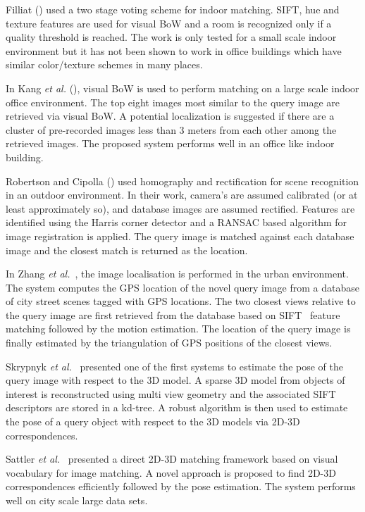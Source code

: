 Filliat (\cite{davidf07}) used a two stage voting
scheme for indoor matching. 
SIFT, hue and texture features are used for visual
BoW and a room is recognized only
if a quality threshold is reached. 
The work is only tested for a small scale indoor 
environment but it has not been shown to work 
in office buildings which have similar 
color/texture schemes in many places.


In Kang \emph{et al.} (\cite{kang09}), visual BoW is used to perform matching
on a large scale indoor office environment. 
The top eight images most similar to the query image are 
retrieved via visual BoW. A potential localization
is suggested if there are a cluster of pre-recorded images less than 3 meters from each
other among the retrieved images. The proposed system
performs well in an office like indoor building.


Robertson and Cipolla (\cite{duncan04}) used homography and rectification 
for scene recognition in an outdoor environment.
In their work, camera's are assumed calibrated (or at least
approximately so), and database images are assumed rectified. Features
are identified using the Harris corner detector and a RANSAC based
algorithm for image registration is applied. The query image is
matched against each database image and the closest match is returned
as the location. 

In Zhang \emph{et al.}~\cite{zhang06}, the image localisation is performed in 
the urban environment. The system computes the 
GPS location of the novel query image 
from a database of city street scenes tagged with 
GPS locations. The two closest views relative to the query 
image are first retrieved from the database based on 
SIFT~\cite{lowe04} feature matching followed by 
the motion estimation. 
The location of the query 
image is finally estimated by the triangulation of GPS 
positions of the closest views. 

Skrypnyk \emph{et al.}~\cite{sky04} presented 
one of the first systems to estimate the pose 
of the query image with respect to 
the 3D model. A sparse 3D model 
from objects of interest is reconstructed using 
multi view geometry and the associated SIFT descriptors 
are stored in a kd-tree. A robust algorithm is then used 
to estimate the pose of a query object with respect to 
the 3D models via 2D-3D correspondences.

Sattler \emph{et al.}~\cite{torsten11} 
presented a direct 2D-3D matching framework 
based on visual vocabulary for image matching. 
A novel approach is proposed to find 2D-3D correspondences 
efficiently followed by the pose estimation. The system 
performs well on city scale large data sets.


